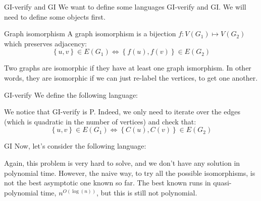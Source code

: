 \documentclass[a4paper]{article}
\begin{document}
\begin{parag}{GI-verify and GI}
    We want to define some languages GI-verify and GI. We will need to define some objects first.

    \begin{subparag}{Graph isomorphism}
        A graph isomorphism is a bijection $f: V\left(G_1\right) \mapsto V\left(G_2\right)$ which preserves adjacency: 
        \[\left\{u, v\right\} \in E\left(G_1\right) \iff \left\{f\left(u\right), f\left(v\right)\right\} \in E\left(G_2\right)\]

        Two graphs are isomorphic if they have at least one graph ismorphism. In other words, they are isomorphic if we can just re-label the vertices, to get one another.
    \end{subparag}

    \begin{subparag}{GI-verify}
        We define the following language: 
        
        We notice that GI-verify is P. Indeed, we only need to iterate over the edges (which is quadratic in the number of vertices) and check that: 
        \[\left\{u, v\right\} \in E\left(G_1\right) \iff \left\{C\left(u\right), C\left(v\right)\right\} \in E\left(G_2\right)\]
    \end{subparag}

    \begin{subparag}{GI}
        Now, let's consider the following language: 

        Again, this problem is very hard to solve, and we don't have any solution in polynomial time. However, the naive way, to try all the possible isomorphisms, is not the best asymptotic one known so far. The best known runs in quasi-polynomial time, $n^{O\left(\log\left(n\right)\right)}$, but this is still not polynomial.
    \end{subparag}
\end{parag}
\end{document}
